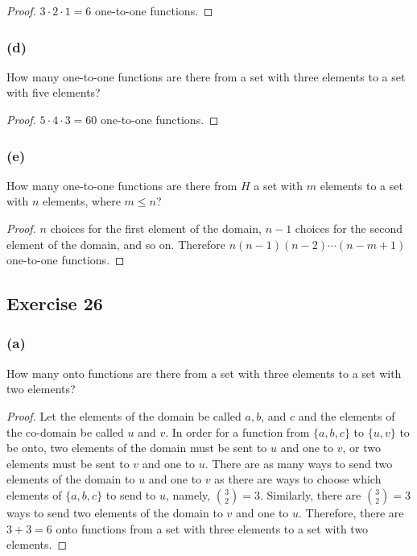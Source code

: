 \documentclass[14pt]{extarticle}
\begin{document}
\begin{proof}
\(3 \cdot 2 \cdot 1 = 6\) one-to-one functions.
\end{proof}

\subsubsection{(d)}
How many one-to-one functions are there from a set with three elements to a set with five elements?

\begin{proof}
\(5 \cdot 4 \cdot 3 = 60\) one-to-one functions.
\end{proof}

\subsubsection{(e)}
How many one-to-one functions are there from \(H\) a set with \(m\) elements to a set with \(n\) elements, where 
\(m \leq n\)?

\begin{proof}
\(n\) choices for the first element of the domain, \(n-1\) choices for the second element of the domain, and so on.
Therefore \(n(n-1)(n-2)\cdots(n-m+1)\) one-to-one functions.
\end{proof}

\subsection{Exercise 26}
\subsubsection{(a)}
How many onto functions are there from a set with three elements to a set with two elements?

\begin{proof}
Let the elements of the domain be called \(a, b\), and \(c\) and the elements of the co-domain be called \(u\) and \(v\). 
In order for a function from \(\{a, b, c\}\) to \(\{u, v\}\) to be onto, two elements of the domain must be sent to \(u\) 
and one to \(v\), or two elements must be sent to \(v\) and one to \(u\). There are as many ways to send two elements of 
the domain to \(u\) and one to \(v\) as there are ways to choose which elements of \(\{a, b, c\}\) to send to \(u\), 
namely, \(\binom{3}{2} = 3\). Similarly, there are \(\binom{3}{2} = 3\) ways to send two elements of the domain to \(v\) and 
one to \(u\). Therefore, there are \(3 + 3 = 6\) onto functions from a set with three elements to a set with two elements.
\end{proof}
\end{document}
